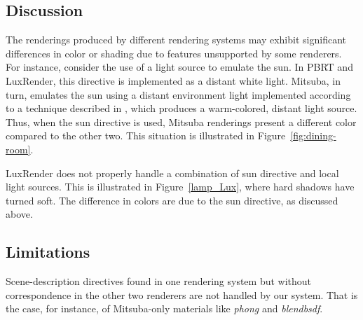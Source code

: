 \subsection{Discussion}
\label{subsec:discussion}

The renderings produced by different rendering systems may exhibit significant differences in color or shading due to features unsupported by some renderers.  
For instance, consider the use of a light source to emulate the sun. In PBRT and LuxRender, this directive is implemented as a distant white light.
Mitsuba, in turn, emulates the sun using a distant environment light implemented according to a technique 
described in \cite{Preetham}, which produces a warm-colored, distant light source. Thus, when the sun directive is used, Mitsuba renderings present a different color compared to the other two. This situation is illustrated in Figure~\ref{fig:dining-room}.

LuxRender does not properly handle a combination of sun directive and local light sources. This is illustrated in Figure~\ref{lamp_Lux}, where hard shadows have turned soft. The difference in colors are due to the sun directive, as discussed above.




\subsection{Limitations}
Scene-description directives found in one rendering system but without correspondence in the other two renderers are not handled by our system. That is the case, for instance, of Mitsuba-only materials like \textit{phong} and \textit{blendbsdf}. 

